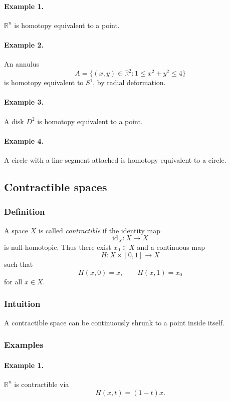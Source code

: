 \documentclass[12pt,a4paper]{article}
\theoremstyle{notespace}
\begin{document}
\paragraph{Example 1.}
\(\mathbb R^n\) is homotopy equivalent to a point.

\paragraph{Example 2.}
An annulus
\[
A=\{(x,y)\in\mathbb R^2:1\le x^2+y^2\le 4\}
\]
is homotopy equivalent to \(S^1\), by radial deformation.

\paragraph{Example 3.}
A disk \(D^2\) is homotopy equivalent to a point.

\paragraph{Example 4.}
A circle with a line segment attached is homotopy equivalent to a circle.

\subsection{Contractible spaces}

\subsubsection*{Definition}

A space \(X\) is called \emph{contractible} if the identity map
\[
\mathrm{id}_X:X\to X
\]
is null-homotopic. Thus there exist \(x_0\in X\) and a continuous map
\[
H:X\times[0,1]\to X
\]
such that
\[
H(x,0)=x,\qquad H(x,1)=x_0
\]
for all \(x\in X\).

\subsubsection*{Intuition}

A contractible space can be continuously shrunk to a point inside itself.

\subsubsection*{Examples}

\paragraph{Example 1.}
\(\mathbb R^n\) is contractible via
\[
H(x,t)=(1-t)x.
\]
\end{document}
